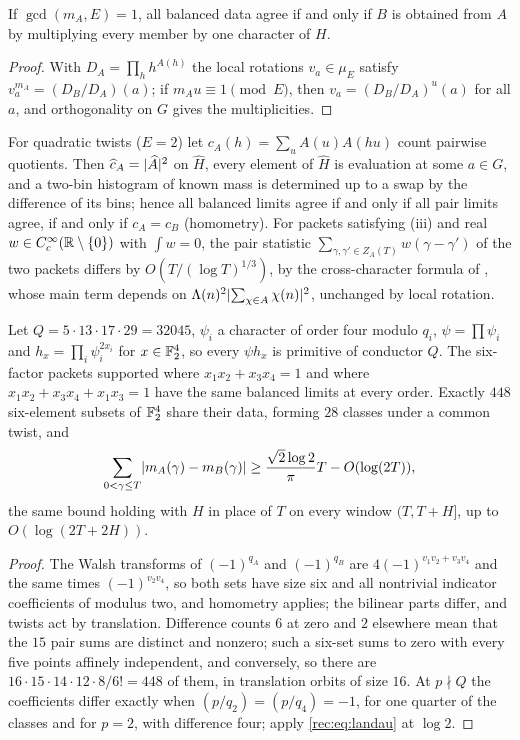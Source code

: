 \begin{corollary}\label{rec:cor:coprime}
If $\gcd(m_A,E)=1$, all balanced data agree if and only if $B$ is obtained from $A$ by multiplying
every member by one character of $H$.
\end{corollary}

\begin{proof}
With $D_A=\prod_hh^{A(h)}$ the local rotations $v_a\in\mu_E$ satisfy $v_a^{m_A}=(D_B/D_A)(a)$; if
$m_Au\equiv1\pmod E$, then $v_a=(D_B/D_A)^u(a)$ for all $a$, and orthogonality on $G$ gives the
multiplicities.
\end{proof}

For quadratic twists ($E=2$) let $c_A(h)=\sum_uA(u)A(hu)$ count pairwise quotients. Then
$\widehat c_A=\lvert\widehat A\rvert^2$ on $\widehat H$, every element of $\widehat H$ is evaluation at some $a\in G$,
and a two-bin histogram of known mass is determined up to a swap by the difference of its bins;
hence all balanced limits agree if and only if all pair limits agree, if and only if $c_A=c_B$
(homometry). For packets satisfying (iii) and real $w\in C_c^\infty(\mathbb{R}\setminus\{0\})$ with $\int w=0$,
the pair statistic $\sum_{\gamma,\gamma'\in Z_A(T)}w(\gamma-\gamma')$ of the two packets differs by
$O(T/(\log T)^{1/3})$, by the cross-character formula of
\cite[Theorem~2]{FordZaharescu2015Unnormalized}, whose main term depends on
$\Lambda(n)^2\lvert\sum_{\chi\in A}\chi(n)\rvert^2$, unchanged by local rotation.

\begin{theorem}\label{rec:thm:six}
Let $Q=5\cdot13\cdot17\cdot29=32045$, $\psi_i$ a character of order four modulo $q_i$,
$\psi=\prod\psi_i$ and $h_x=\prod_i\psi_i^{2x_i}$ for $x\in\mathbb{F}_2^4$, so every $\psi h_x$ is primitive of
conductor $Q$. The six-factor packets supported where $x_1x_2+x_3x_4=1$ and where
$x_1x_2+x_3x_4+x_1x_3=1$ have the same balanced limits at every order. Exactly $448$ six-element
subsets of $\mathbb{F}_2^4$ share their data, forming $28$ classes under a common twist, and
\[
 \sum_{0<\gamma\le T}\lvert m_A(\gamma)-m_B(\gamma)\rvert\ge\frac{\sqrt2\log2}\pi T-O(\log(2T)),
\]
the same bound holding with $H$ in place of $T$ on every window $(T,T+H]$, up to $O(\log(2T+2H))$.
\end{theorem}

\begin{proof}
The Walsh transforms of $(-1)^{q_A}$ and $(-1)^{q_B}$ are $4(-1)^{v_1v_2+v_3v_4}$ and the same times
$(-1)^{v_2v_4}$, so both sets have size six and all nontrivial indicator coefficients of modulus two,
and homometry applies; the bilinear parts differ, and twists act by translation. Difference counts
$6$ at zero and $2$ elsewhere mean that the $15$ pair sums are distinct and nonzero; such a six-set
sums to zero with every five points affinely independent, and conversely, so there are
$16\cdot15\cdot14\cdot12\cdot8/6!=448$ of them, in translation orbits of size $16$. At $p\nmid Q$ the
coefficients differ exactly when $(p/q_2)=(p/q_4)=-1$, for one quarter of the classes and for $p=2$,
with difference four; apply \eqref{rec:eq:landau} at $\log2$.
\end{proof}


